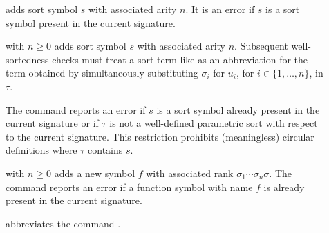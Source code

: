 \begin{description}

%
\item[]
adds sort symbol $s$ with associated arity $n$.
It is an error if $s$ is a sort symbol present in the current signature.
\smallskip

%
\item[] with $n \geq 0$
adds sort symbol $s$ with associated arity $n$.
Subsequent well-sortedness checks must treat a sort term like
as an abbreviation for the term obtained by simultaneously substituting
$\sigma_i$ for $u_i$, for $i\in\{1,\ldots,n\}$, in $\tau$.

The command reports an error
if $s$ is a sort symbol already present in the current signature or
if $\tau$ is not a well-defined parametric sort 
with respect to the current signature.
This restriction prohibits (meaningless) circular definitions
where $\tau$ contains $s$.
\smallskip

%
\item[]
with $n \geq 0$ adds a new symbol $f$ 
with associated rank $\sigma_1\cdots\sigma_n\sigma$.
The command reports an error if a function symbol with name $f$ 
is already present in the current signature.
\smallskip

%
\item[]
abbreviates the command .
\smallskip


\end{description}
